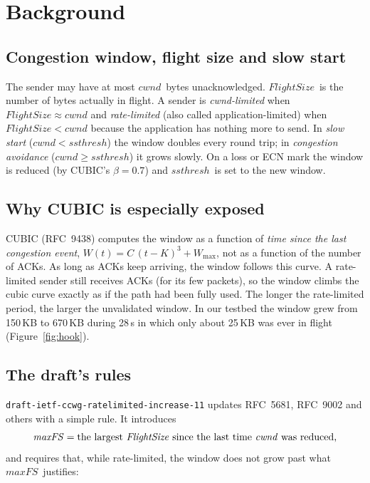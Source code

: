 \documentclass[11pt,a4paper]{article}
\newcommand{\maxfs}{\ensuremath{\mathit{maxFS}}}
\newcommand{\cwnd}{\ensuremath{\mathit{cwnd}}}
\newcommand{\ssthresh}{\ensuremath{\mathit{ssthresh}}}
\newcommand{\fs}{\ensuremath{\mathit{FlightSize}}}
\begin{document}
\section{Background}
\label{sec:bg}

\subsection{Congestion window, flight size and slow start}

The sender may have at most \cwnd\ bytes unacknowledged. \fs\ is the number
of bytes actually in flight. A sender is \emph{cwnd-limited} when
$\fs \approx \cwnd$ and \emph{rate-limited} (also called application-limited)
when $\fs < \cwnd$ because the application has nothing more to send.
In \emph{slow start} ($\cwnd < \ssthresh$) the window doubles every round
trip; in \emph{congestion avoidance} ($\cwnd \ge \ssthresh$) it grows slowly.
On a loss or ECN mark the window is reduced (by CUBIC's $\beta = 0.7$) and
\ssthresh\ is set to the new window.

\subsection{Why CUBIC is especially exposed}

CUBIC (RFC~9438) computes the window as a function of \emph{time since the
last congestion event}, $W(t) = C\,(t-K)^3 + W_{\max}$, not as a function of
the number of ACKs. As long as ACKs keep arriving, the window follows this
curve. A rate-limited sender still receives ACKs (for its few packets), so
the window climbs the cubic curve exactly as if the path had been fully used.
The longer the rate-limited period, the larger the unvalidated window. In our
testbed the window grew from 150\,KB to 670\,KB during 28\,s in which only
about 25\,KB was ever in flight (Figure~\ref{fig:hook}).

\subsection{The draft's rules}

\texttt{draft-ietf-ccwg-ratelimited-increase-11} updates RFC~5681, RFC~9002
and others with a simple rule. It introduces
\[
  \maxfs = \text{the largest \fs\ since the last time \cwnd\ was reduced,}
\]
and requires that, while rate-limited, the window does not grow past what
\maxfs\ justifies:
\end{document}

